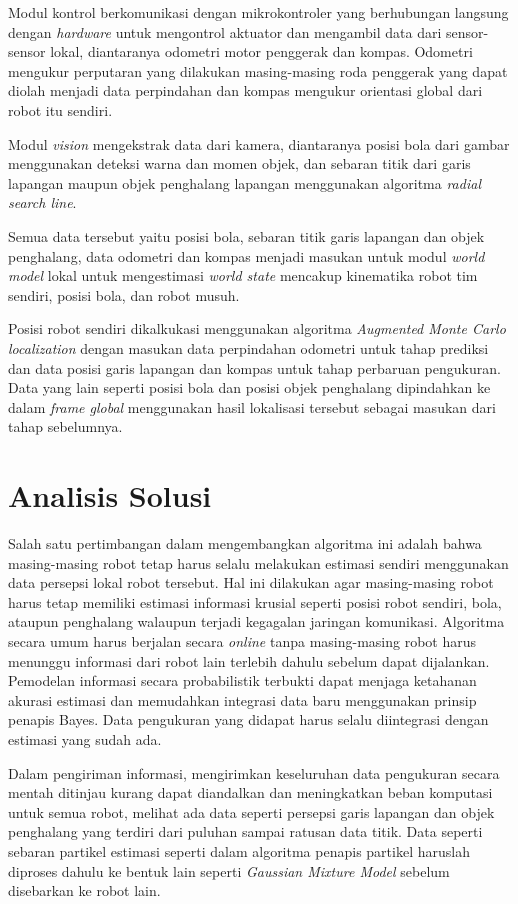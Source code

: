 Modul kontrol berkomunikasi dengan mikrokontroler yang berhubungan langsung dengan \textit{hardware} untuk mengontrol aktuator dan mengambil data dari sensor-sensor lokal, diantaranya odometri motor penggerak dan kompas. Odometri mengukur perputaran yang dilakukan masing-masing roda penggerak yang dapat diolah menjadi data perpindahan dan kompas mengukur orientasi global dari robot itu sendiri.

Modul \textit{vision} mengekstrak data dari kamera, diantaranya posisi bola dari gambar menggunakan deteksi warna dan momen objek, dan sebaran titik dari garis lapangan maupun objek penghalang lapangan menggunakan algoritma \textit{radial search line}.

Semua data tersebut yaitu posisi bola, sebaran titik garis lapangan dan objek penghalang, data odometri dan kompas menjadi masukan untuk modul \textit{world model} lokal untuk mengestimasi \textit{world state} mencakup kinematika robot tim sendiri, posisi bola, dan robot musuh.

Posisi robot sendiri dikalkukasi menggunakan algoritma \textit{Augmented Monte Carlo localization} dengan masukan data perpindahan odometri untuk tahap prediksi dan data posisi garis lapangan dan kompas untuk tahap perbaruan pengukuran. Data yang lain seperti posisi bola dan posisi objek penghalang dipindahkan ke dalam \textit{frame global} menggunakan hasil lokalisasi tersebut sebagai masukan dari tahap sebelumnya.

\section{Analisis Solusi}

Salah satu pertimbangan dalam mengembangkan algoritma ini adalah bahwa masing-masing robot tetap harus selalu melakukan estimasi sendiri menggunakan data persepsi lokal robot tersebut. Hal ini dilakukan agar masing-masing robot harus tetap memiliki estimasi informasi krusial seperti posisi robot sendiri, bola, ataupun penghalang walaupun terjadi kegagalan jaringan komunikasi. Algoritma secara umum harus berjalan secara \textit{online} tanpa masing-masing robot harus menunggu informasi dari robot lain terlebih dahulu sebelum dapat dijalankan. Pemodelan informasi secara probabilistik terbukti dapat menjaga ketahanan akurasi estimasi dan memudahkan integrasi data baru menggunakan prinsip penapis Bayes. Data pengukuran yang didapat harus selalu diintegrasi dengan estimasi yang sudah ada.

Dalam pengiriman informasi, mengirimkan keseluruhan data pengukuran secara mentah ditinjau kurang dapat diandalkan dan meningkatkan beban komputasi untuk semua robot, melihat ada data seperti persepsi garis lapangan dan objek penghalang yang terdiri dari puluhan sampai ratusan data titik. Data seperti sebaran partikel estimasi seperti dalam algoritma penapis partikel haruslah diproses dahulu ke bentuk lain seperti \textit{Gaussian Mixture Model} sebelum disebarkan ke robot lain.

